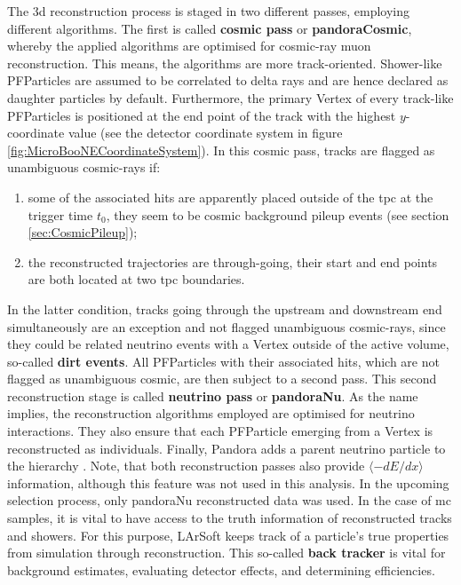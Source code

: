 The \gls{3d} reconstruction process is staged in two different passes, employing different algorithms. The first is called \textbf{cosmic pass} or \textbf{pandoraCosmic}, whereby the applied algorithms are optimised for cosmic-ray muon reconstruction. This means, the algorithms are more track-oriented. Shower-like PFParticles are assumed to be correlated to delta rays and are hence declared as daughter particles by default. Furthermore, the primary \gls{Vertex} of every track-like PFParticles is positioned at the end point of the track with the highest $y$-coordinate value (see the detector coordinate system in figure \ref{fig:MicroBooNECoordinateSystem}). In this cosmic pass, tracks are flagged as unambiguous cosmic-rays if:
\begin{enumerate}
    \item some of the associated hits are apparently placed outside of the \gls{tpc} at the trigger time $t_0$, \ie they seem to be cosmic background pileup events (see section \ref{sec:CosmicPileup});
    \item the reconstructed trajectories are through-going, \ie their start and end points are both located at two \gls{tpc} boundaries.
\end{enumerate}
In the latter condition, tracks going through the upstream and downstream end simultaneously are an exception and not flagged unambiguous cosmic-rays, since they could be related neutrino events with a \gls{Vertex} outside of the active volume, so-called \textbf{dirt events}. All PFParticles with their associated hits, which are not flagged as unambiguous cosmic, are then subject to a second pass. This second reconstruction stage is called \textbf{neutrino pass} or \textbf{pandoraNu}. As the name implies, the reconstruction algorithms employed are optimised for neutrino interactions. They also ensure that each PFParticle emerging from a \gls{Vertex} is reconstructed as individuals. Finally, \gls{Pandora} adds a parent neutrino particle to the hierarchy \cite{MicroBooNECCInclPN,PandoraLAr}. Note, that both reconstruction passes also provide $\langle -dE/dx \rangle$ information, although this feature was not used in this analysis. In the upcoming selection process, only pandoraNu reconstructed data was used. In the case of \gls{mc} samples, it is vital to have access to the truth information of reconstructed tracks and showers. For this purpose, \gls{LArSoft} keeps track of a particle's true properties from simulation through reconstruction. This so-called \textbf{back tracker} is vital for background estimates, evaluating detector effects, and determining efficiencies.


